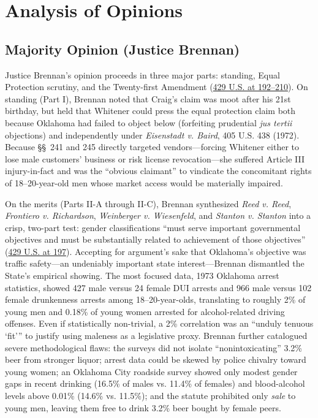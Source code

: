 \documentclass[12pt]{article}
\begin{document}
\section{Analysis of Opinions}

\subsection{Majority Opinion (Justice Brennan)}

Justice Brennan's opinion proceeds in three major parts: standing, Equal Protection scrutiny, and the Twenty-first Amendment (\href{https://supreme.justia.com/cases/federal/us/429/190/}{429 U.S. at 192--210}). On standing (Part I), Brennan noted that Craig's claim was moot after his 21st birthday, but held that Whitener could press the equal protection claim both because Oklahoma had failed to object below (forfeiting prudential \textit{jus tertii} objections) and independently under \textit{Eisenstadt v. Baird}, 405 U.S. 438 (1972). Because \S\S\ 241 and 245 directly targeted vendors---forcing Whitener either to lose male customers' business or risk license revocation---she suffered Article III injury-in-fact and was the ``obvious claimant'' to vindicate the concomitant rights of 18--20-year-old men whose market access would be materially impaired.

On the merits (Parts II-A through II-C), Brennan synthesized \textit{Reed v. Reed}, \textit{Frontiero v. Richardson}, \textit{Weinberger v. Wiesenfeld}, and \textit{Stanton v. Stanton} into a crisp, two-part test: gender classifications ``must serve important governmental objectives and must be substantially related to achievement of those objectives'' (\href{https://supreme.justia.com/cases/federal/us/429/190/}{429 U.S. at 197}). Accepting for argument's sake that Oklahoma's objective was traffic safety---an undeniably important state interest---Brennan dismantled the State's empirical showing. The most focused data, 1973 Oklahoma arrest statistics, showed 427 male versus 24 female DUI arrests and 966 male versus 102 female drunkenness arrests among 18--20-year-olds, translating to roughly 2\% of young men and 0.18\% of young women arrested for alcohol-related driving offenses. Even if statistically non-trivial, a 2\% correlation was an ``unduly tenuous `fit''' to justify using maleness as a legislative proxy. Brennan further catalogued severe methodological flaws: the surveys did not isolate ``nonintoxicating'' 3.2\% beer from stronger liquor; arrest data could be skewed by police chivalry toward young women; an Oklahoma City roadside survey showed only modest gender gaps in recent drinking (16.5\% of males vs. 11.4\% of females) and blood-alcohol levels above 0.01\% (14.6\% vs. 11.5\%); and the statute prohibited only \textit{sale} to young men, leaving them free to drink 3.2\% beer bought by female peers.
\end{document}
